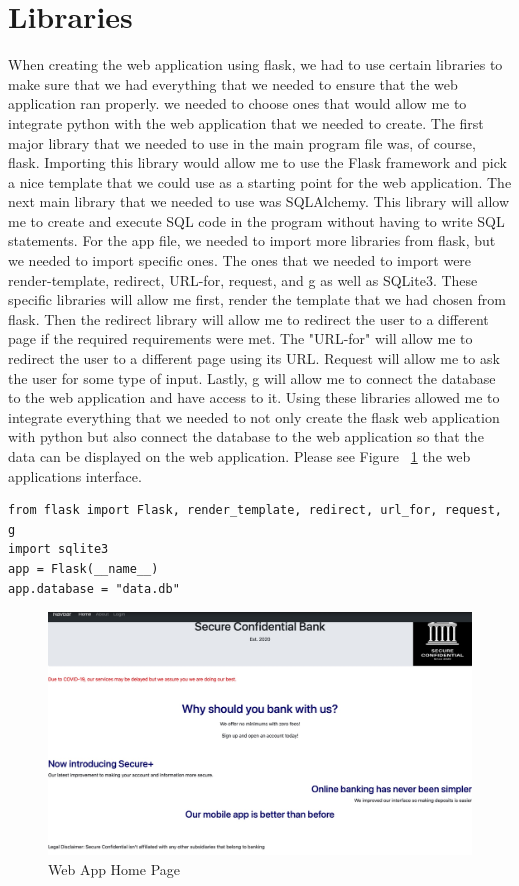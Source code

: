 \section{Libraries}
\label{sec:libraries}


When creating the web application using flask, we had to use certain libraries to make sure that we had everything that we needed to ensure that the web application ran properly. we needed to choose ones that would allow me to integrate python with the web application that we needed to create. The first major library that we needed to use in the main program file was, of course, flask. Importing this library would allow me to use the Flask framework and pick a nice template that we could use as a starting point for the web application. The next main library that we needed to use was SQLAlchemy. This library will allow me to create and execute SQL code in the program without having to write SQL statements. For the app file, we needed to import more libraries from flask, but we needed to import specific ones. The ones that we needed to import were render-template, redirect, URL-for, request, and g as well as SQLite3. These specific libraries will allow me first, render the template that we had chosen from flask. Then the redirect library will allow me to redirect the user to a different page if the required requirements were met. The "URL-for" will allow me to redirect the user to a different page using its URL. Request will allow me to ask the user for some type of input. Lastly, g will allow me to connect the database to the web application and have access to it. Using these libraries allowed me to integrate everything that we needed to not only create the flask web application with python but also connect the database to the web application so that the data can be displayed on the web application. Please see Figure ~\ref{fig:web app home page} the web applications interface.


\bigskip
\bigskip
\begin{lstlisting}
from flask import Flask, render_template, redirect, url_for, request, g
import sqlite3
app = Flask(__name__)
app.database = "data.db"
\end{lstlisting}
\bigskip
\bigskip



\bigskip
\bigskip
\begin{figure}[hbt!]
\centering
\includegraphics[width=5in]{../images/website.png}%
\caption{Web App Home Page}
\label{fig:web app home page}
\end{figure}

